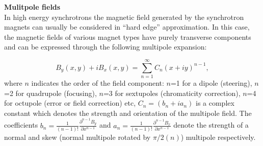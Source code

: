\textbf{Mulitpole fields}\\
In high energy synchrotrons the magnetic field generated by the synchrotron magnets can usually be considered in “hard edge” approximation. In this case,
the magnetic fields of various magnet types have purely transverse components and can be expressed through the following multipole expansion:

\begin{equation}\label{eq:mult_expansion} %
    B_y(x,y) + i B_x(x,y) = \sum_{n=1}^{\infty} C_n (x+i y)^{n-1},
\end{equation} %
where $n$ indicates the order of the field component: $n$=1 for a dipole (steering), $n$=2 for quadrupole (focusing), $n$=3 for sextupoles (chromaticity correction), $n$=4 for octupole (error or field correction) etc, $C_n=(b_n +i a_n)$ is a complex constant which denotes the strength and orientation of the multipole field. The coefficients $b_n=\frac{1}{(n-1)!} \frac{\partial^{n-1}B_y}{\partial x^{n-1}}$ and $a_n=\frac{1}{(n-1)!} \frac{\partial^{n-1}B_x}{\partial x^{n-1}}$ denote the strength of a normal and skew (normal multipole rotated by $\pi/2(n)$) multipole respectively.%


